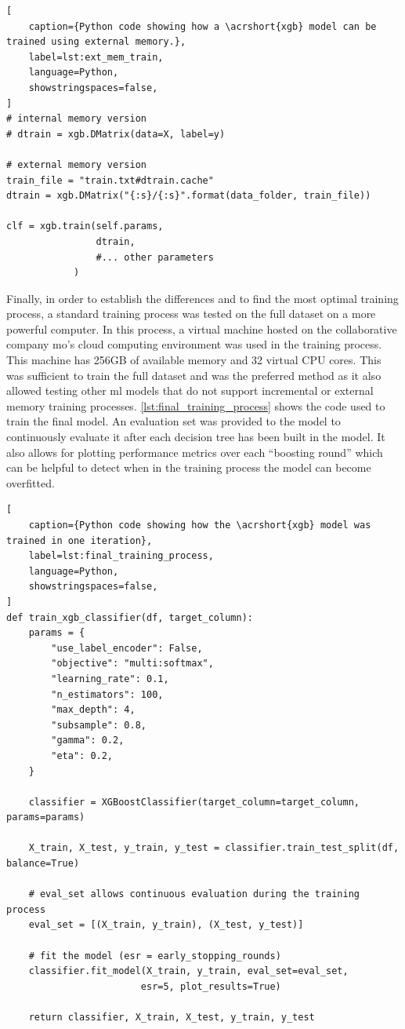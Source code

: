 \begin{lstlisting}[
    caption={Python code showing how a \acrshort{xgb} model can be trained using external memory.},
    label=lst:ext_mem_train,
    language=Python,
    showstringspaces=false,
]
# internal memory version
# dtrain = xgb.DMatrix(data=X, label=y)

# external memory version
train_file = "train.txt#dtrain.cache"
dtrain = xgb.DMatrix("{:s}/{:s}".format(data_folder, train_file))

clf = xgb.train(self.params,
                dtrain,
                #... other parameters
            )
\end{lstlisting}

Finally, in order to establish the differences and to find the most optimal training process, a standard training process was tested on the full dataset on a more powerful computer. In this process, a virtual machine hosted on the collaborative company \acrfull{mo}'s cloud computing environment was used in the training process. This machine has 256GB of available memory and 32 virtual CPU cores. This was sufficient to train the full dataset and was the preferred method as it also allowed testing other \acrshort{ml} models that do not support incremental or external memory training processes. \cref{lst:final_training_process} shows the code used to train the final model. An evaluation set was provided to the model to continuously evaluate it after each decision tree has been built in the model. It also allows for plotting performance metrics over each ``boosting round'' which can be helpful to detect when in the training process the model can become overfitted.

\begin{lstlisting}[
    caption={Python code showing how the \acrshort{xgb} model was trained in one iteration},
    label=lst:final_training_process,
    language=Python,
    showstringspaces=false,
]
def train_xgb_classifier(df, target_column):
    params = {
        "use_label_encoder": False,
        "objective": "multi:softmax",
        "learning_rate": 0.1,
        "n_estimators": 100,
        "max_depth": 4,
        "subsample": 0.8,
        "gamma": 0.2,
        "eta": 0.2,
    }

    classifier = XGBoostClassifier(target_column=target_column, params=params)

    X_train, X_test, y_train, y_test = classifier.train_test_split(df, balance=True)

    # eval_set allows continuous evaluation during the training process
    eval_set = [(X_train, y_train), (X_test, y_test)]

    # fit the model (esr = early_stopping_rounds)
    classifier.fit_model(X_train, y_train, eval_set=eval_set,
                        esr=5, plot_results=True)

    return classifier, X_train, X_test, y_train, y_test
\end{lstlisting}

